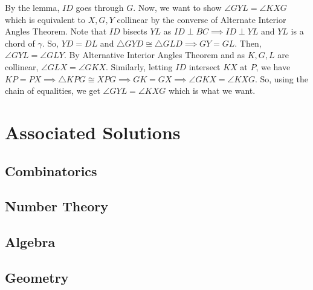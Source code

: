 \documentclass[11pt]{article}
\begin{document}
\begin{sol}
By the lemma, $ID$ goes through $G$. Now, we want to show $\angle GYL = \angle KXG$ which is equivalent to $X,G,Y$ collinear by the converse of Alternate Interior Angles Theorem.  Note that $ID$ bisects $YL$ as $ID\perp BC\implies ID\perp YL$ and $YL$ is a chord of $\gamma$. So, $YD=DL$ and $\triangle GYD \cong \triangle GLD\implies GY=GL$. Then, $\angle GYL = \angle GLY$. By Alternative Interior Angles Theorem and as $K,G,L$ are collinear, $\angle GLX=\angle GKX$. Similarly, letting $ID$ intersect $KX$ at $P$, we have $KP=PX\implies \triangle KPG \cong XPG\implies GK=GX\implies \angle GKX = \angle KXG$. So, using the chain of equalities, we get $\angle GYL = \angle KXG$ which is what we want.  
\end{sol}

\section{Associated Solutions}
\subsection{Combinatorics}

\setcounter{problem}{0}
\subsection{Number Theory}


\setcounter{problem}{0}
\subsection{Algebra}

\setcounter{problem}{0}
\subsection{Geometry}
\end{document}
